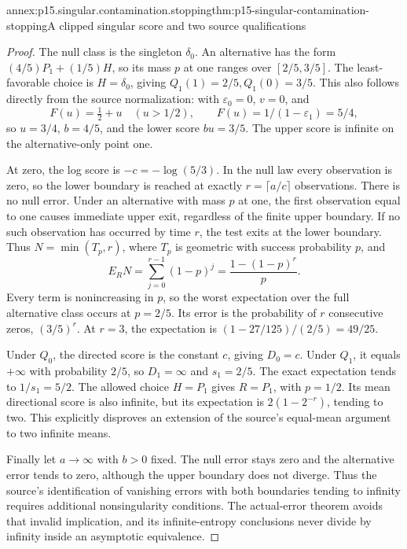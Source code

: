 \begin{annexitem}{annex:p15.singular.contamination.stopping}{thm:p15-singular-contamination-stopping}{A clipped singular score and two source qualifications}
\begin{proof}
The null class is the singleton \(\delta_0\).
An alternative has the form \((4/5)P_1+(1/5)H\), so its mass \(p\)
at one ranges over \([2/5,3/5]\).
The least-favorable choice is \(H=\delta_0\), giving
\(Q_1(1)=2/5,Q_1(0)=3/5\).
This also follows directly from the source normalization:
with \(\varepsilon_0=0\), \(v=0\), and
\[
 F(u)=\tfrac12+u\quad(u>1/2),\qquad
 F(u)=1/(1-\varepsilon_1)=5/4,
\]
so \(u=3/4\), \(b=4/5\), and the lower score \(bu=3/5\).
The upper score is infinite on the alternative-only point one.

At zero, the log score is \(-c=-\log(5/3)\).
In the null law every observation is zero, so the lower boundary
is reached at exactly \(r=\lceil a/c\rceil\) observations.
There is no null error.
Under an alternative with mass \(p\) at one, the first observation
equal to one causes immediate upper exit, regardless of the finite
upper boundary. If no such observation has occurred by time \(r\),
the test exits at the lower boundary.
Thus \(N=\min(T_p,r)\), where \(T_p\) is geometric with success
probability \(p\), and
\[
 E_RN=\sum_{j=0}^{r-1}(1-p)^j=\frac{1-(1-p)^r}{p}.
\]
Every term is nonincreasing in \(p\), so the worst expectation
over the full alternative class occurs at \(p=2/5\).
Its error is the probability of \(r\) consecutive zeros,
\((3/5)^r\). At \(r=3\), the expectation is
\((1-27/125)/(2/5)=49/25\).

Under \(Q_0\), the directed score is the constant \(c\), giving
\(D_0=c\). Under \(Q_1\), it equals \(+\infty\) with probability
\(2/5\), so \(D_1=\infty\) and \(s_1=2/5\).
The exact expectation tends to \(1/s_1=5/2\).
The allowed choice \(H=P_1\) gives \(R=P_1\), with \(p=1/2\).
Its mean directional score is also infinite, but its expectation
is \(2(1-2^{-r})\), tending to two. This explicitly disproves an
extension of the source's equal-mean argument to two infinite means.

Finally let \(a\to\infty\) with \(b>0\) fixed.
The null error stays zero and the alternative error tends to zero,
although the upper boundary does not diverge. Thus the source's
identification of vanishing errors with both boundaries tending to
infinity requires additional nonsingularity conditions.
The actual-error theorem avoids that invalid implication, and its
infinite-entropy conclusions never divide by infinity inside an
asymptotic equivalence.
\end{proof}
\end{annexitem}
